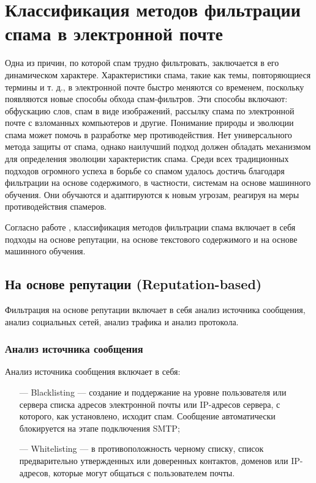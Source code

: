 \section{Классификация методов фильтрации спама в электронной почте}\label{Section:Filtering}

Одна из причин, по которой спам трудно фильтровать, заключается в
его динамическом характере. Характеристики спама, такие как темы,
повторяющиеся термины и т. д., в электронной почте быстро меняются
со временем, поскольку появляются новые способы обхода спам-фильтров.
Эти способы включают: обфускацию слов, спам в виде изображений,
рассылку спама по электронной почте с взломанных компьютеров и другие.
Понимание природы и эволюции спама может помочь в разработке мер
противодействия. Нет универсального метода защиты от спама, однако
наилучший подход должен обладать механизмом для определения эволюции
характеристик спама. Среди всех традиционных подходов огромного успеха
в борьбе со спамом удалось достичь благодаря фильтрации на основе
содержимого, в частности, системам на основе машинного обучения.
Они обучаются и адаптируются к новым угрозам, реагируя на меры
противодействия спамеров.

Согласно работе \cite{filters}, классификация методов фильтрации спама включает в себя подходы
на основе репутации, на основе текстового содержимого и на основе машинного обучения.

\subsection{На основе репутации (Reputation-based)}

Фильтрация на основе репутации включает в себя анализ источника сообщения, анализ социальных сетей,
анализ трафика и анализ протокола.

\subsubsection{Анализ источника сообщения}

Анализ источника сообщения включает в себя:

\begin{itemize}
    \item[—] Blacklisting — создание и поддержание на уровне пользователя
        или сервера списка адресов электронной почты или IP-адресов сервера,
        с которого, как установлено, исходит спам. Сообщение автоматически
        блокируется на этапе подключения SMTP;
    \item[—] Whitelisting — в противоположность черному списку, список
        предварительно утвержденных или доверенных контактов, доменов или
        IP-адресов, которые могут общаться с пользователем почты.
\end{itemize}


